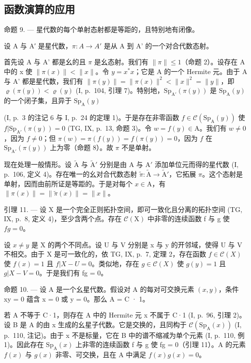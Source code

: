 \subsection{函数演算的应用}

命题 9. --- 星代数的每个单射态射都是等距的，且特别地有闭像。

设 A 与 A′ 是星代数，\(\pi\colon A\to A'\) 是从 A 到 A' 的一个对合代数态射。

首先设 A 与 A' 都是幺的且 \(\pi\) 是幺态射。我们有 \(\|\pi\| \leqslant 1\)（命题 2）。设存在 A 中的 x 使 \(\|\pi(x)\| < \|x\|\)。令 \(y = x^{*}x\)；它是 A 的一个 Hermite 元。由于 A 与 A' 都是星代数，我们有 \(\|\pi(y)\| = \|\pi(x)\|^{2} < \|x\|^{2} = \|y\|\)，即 \(\varrho(\pi(y)) < \varrho(y)\) (I, p.~104, 引理 7)。特别地，\(\mathrm{Sp}_{\mathrm{A}'}(\pi(y))\) 是 \(\mathrm{Sp}_{\mathrm{A}}(y)\) 的一个闭子集，且异于 \(\mathrm{Sp}_{\mathrm{A}}(y)\)

(I, p.~3 的注记 6 与 I, p.~24 的定理 1)。于是存在非零函数 \(f \in \mathcal{C}(\mathrm{Sp}_{\mathrm{A}}(y))\) 使 \(f| \mathrm{Sp}_{\mathrm{A}'}(\pi(y)) = 0\) (TG, IX, p.~13, 命题 3)。令 \(w = f(y) \in \mathrm{A}\)。我们有 \(w \neq 0\)，因为 \(f \neq 0\)；但 \(\pi(w) = \pi(f(y)) = f(\pi(y)) = 0\)，因为 \(f\) 在 \(\mathrm{Sp}_{\mathrm{A}'}(\pi(y))\) 上为零（命题 8）。故 \(\pi\) 不是单射。

现在处理一般情形。设 \(\widetilde{\mathrm{A}}\) 与 \(\widetilde{\mathrm{A}}'\) 分别是由 A 与 \(\mathrm{A}'\) 添加单位元而得的星代数 (I, p.~106, 定义 4)。存在唯一的幺对合代数态射 \(\widetilde{\pi}\colon \widetilde{\mathrm{A}}\to \widetilde{\mathrm{A}}'\)，它拓展 \(\pi\)。这个态射是单射，因而由前所证是等距的。于是对每个 \(x\in \mathrm{A}\)，有 \(\| \pi (x)\| = \| \widetilde{\pi} (x)\| = \| x\|\)。

引理 11. --- 设 X 是一个完全正则拓扑空间，即可一致化且分离的拓扑空间 (TG, IX, p.~8, 定义 4)，至少含两个点。存在 \(\mathcal{C}(\mathrm{X})\) 中非零的连续函数 f 与 g 使 \(fg = 0\)。

设 \(x \neq y\) 是 X 的两个不同点。设 U 与 V 分别是 x 与 y 的开邻域，使得 U 与 V 不相交。由于 X 是可一致化的，依 TG, IX, p.~7, 定理 2，存在函数 \(f \in \mathcal{C}(X)\) 使 \(f(x) = 1\) 且 \(f|X - U = 0\)。类似地，存在 \(g \in \mathcal{C}(X)\) 使 \(g(y) = 1\) 且 \(g|X - V = 0\)。于是我们有 fg = 0。

命题 10. --- 设 A 是一个幺星代数。假设对 A 的每对可交换元素 \((x,y)\)，条件 xy = 0 蕴含 x = 0 或 y = 0。那么 A = C · 1。

若 A 不等于 C·1，则存在 A 中的 Hermite 元 x 不属于 C·1 (I, p.~96, 引理 2)。设 B 是 A 的由 x 生成的幺星子代数。它是交换的，且同构于 \(\mathcal{C}(\mathrm{Sp}_{\mathrm{A}}(x))\) (I, p.~110, 注记)。由于 x 不是标量，它在 B 中的谱不缩减为单个元素 (I, p.~110, 例 1)。因此存在 \(\mathrm{Sp}_{\mathrm{A}}(x)\) 上非零的连续函数 f 与 g 使 fg = 0（引理 11）。A 的元素 \(f(x)\) 与 \(g(x)\) 非零、可交换，且在 A 中满足 \(f(x)g(x) = 0\)。

